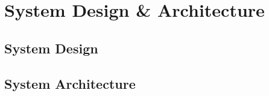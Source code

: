 \chapter{System Design \& Architecture\label{chap:design}}

\section{System Design}

\section{System Architecture}